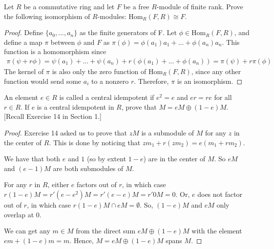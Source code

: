 \documentclass[10pt]{article}
\newenvironment{problem}[2][Problem]{\begin{trivlist}
		\item[\hskip \labelsep {\bfseries #1}\hskip \labelsep {\bfseries #2.}]}{\end{trivlist}}
\begin{document}
	\begin{problem}{3.13}
		Let $R$ be a commutative ring and let $F$ be a free $R$-module of finite rank. Prove the following isomorphism of $R$-modules: $\text{Hom}_R(F, R) \cong F$.
		\begin{proof}
			 Define $\{a_0,...,a_n\}$ as the finite generators of F. Let $\phi \in \text{Hom}_R(F, R)$, and define a map $\pi$ between $\phi$ and $F$ as $\pi(\phi) = \phi(a_1)a_1 + ... + \phi(a_n)a_n$. This function is a homomorphism since \begin{align*}
			 	\pi(\psi + r\phi) = \psi(a_1) + ... + \psi(a_n) + r(\phi(a_1) + ... + \phi(a_n)) = \pi(\psi) + r\pi(\phi)
			 \end{align*}
			 The kernel of $\pi$ is also only the zero function of $\text{Hom}_R(F, R)$, since any other function would send some $a_i$ to a nonzero $r$. Therefore, $\pi$ is an isomorphism. 
		\end{proof}
	\end{problem}
	
	\begin{problem}{3.15}
		An element $e \in R$ is called a central idempotent if $e^2 = e$ and $er=re$ for all $r \in R$. If $e$ is a central idempotent in $R$, prove that $M = eM \oplus (1 -e)M$. [Recall Exercise 14 in Section 1.]
		\begin{proof}
			Exercise 14 asked us to prove that $zM$ is a submodule of $M$ for any $z$ in the center of $R$. This is done by noticing that $zm_1 + r(zm_2) = e(m_1 + rm_2)$. 
			
			We have that both $e$ and $1$ (so by extent $1-e$) are in the center of $M$. So $eM$ and $(e-1)M$ are both submodules of $M$.
			
			For any $r$ in $R$, either $e$ factors out of $r$, in which case $r(1-e)M = r'(e-e^2)M = r'(e-e)M = r'0M = 0$. Or, $e$ does not factor out of $r$, in which case $r(1-e)M \cap eM = \emptyset$. So, $(1-e)M$ and $eM$ only overlap at $0$.
			
			We can get any $m \in M$ from the direct sum $eM \oplus (1 -e)M$ with the element $em + (1-e)m = m$. Hence, $M = eM \oplus (1 -e)M$ spans $M$.
		\end{proof}
	\end{problem}
	
\end{document}
